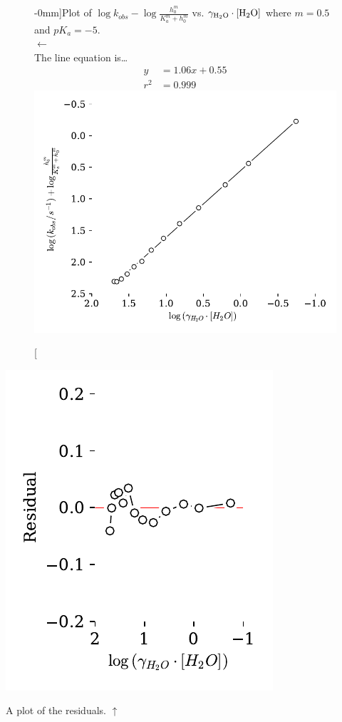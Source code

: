 \documentclass[]{tufte-handout}
\begin{document}
\begin{figure}[h!]
  \centering
  \caption[][-0mm]{Plot of $\log{k_{obs}}-\log{\frac{h_0^m}{K_a^m + h_0^m}}$ vs. $\gamma_{\ce{H2O}} \cdot [\ce{H2O}]$ where $m = 0.5$ and $pK_a = -5$.\\ $\longleftarrow$ \\ The line equation is\ldots \begin{align*}y &= 1.06x+0.55 \\ r^2 &= 0.999\end{align*}} 
  \includegraphics[scale=0.7]{images/fig18}
  \label{fig:fig18}
\end{figure}


\begin{marginfigure}[-40mm]
  \centering
  \includegraphics[scale=0.7]{images/fig18r}
  \caption{A plot of the residuals. $\uparrow$} 
  \label{fig:fig19}
\end{marginfigure}
\end{document}
